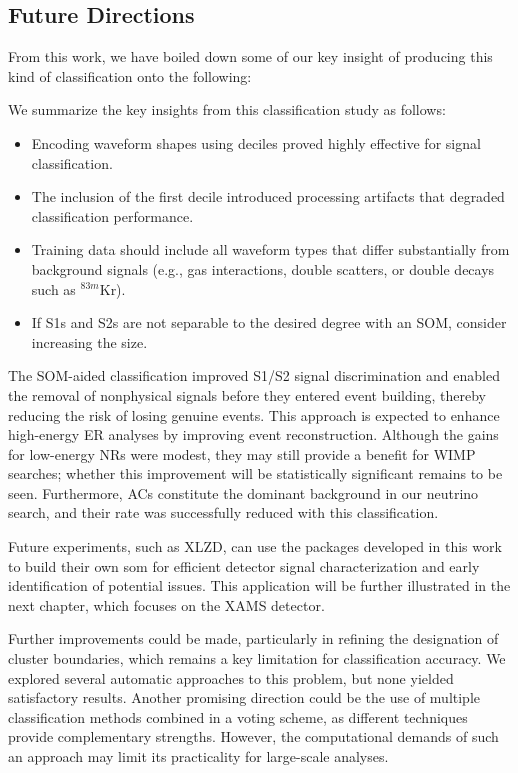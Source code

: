 \subsection{Future Directions}

From this work, we have boiled down some of our key insight of producing this kind of classification onto the following:

We summarize the key insights from this classification study as follows:

\begin{itemize}
    \item Encoding waveform shapes using deciles proved highly effective for signal classification.
    \item The inclusion of the first decile introduced processing artifacts that degraded classification performance.
    \item Training data should include all waveform types that differ substantially from background signals (e.g., gas interactions, double scatters, or double decays such as $^{83m}$Kr).
    \item If S1s and S2s are not separable to the desired degree with an SOM, consider increasing the size.
\end{itemize}

The SOM-aided classification improved S1/S2 signal discrimination and enabled the removal of nonphysical signals before they entered event building, thereby reducing the risk of losing genuine events. This approach is expected to enhance high-energy ER analyses by improving event reconstruction. Although the gains for low-energy NRs were modest, they may still provide a benefit for WIMP searches; whether this improvement will be statistically significant remains to be seen. Furthermore, ACs constitute the dominant background in our neutrino search, and their rate was successfully reduced with this classification.

Future experiments, such as XLZD, can use the packages developed in this work to build their own \acrshort{som} for efficient detector signal characterization and early identification of potential issues. This application will be further illustrated in the next chapter, which focuses on the XAMS detector.

Further improvements could be made, particularly in refining the designation of cluster boundaries, which remains a key limitation for classification accuracy. We explored several automatic approaches to this problem, but none yielded satisfactory results. Another promising direction could be the use of multiple classification methods combined in a voting scheme, as different techniques provide complementary strengths. However, the computational demands of such an approach may limit its practicality for large-scale analyses.


